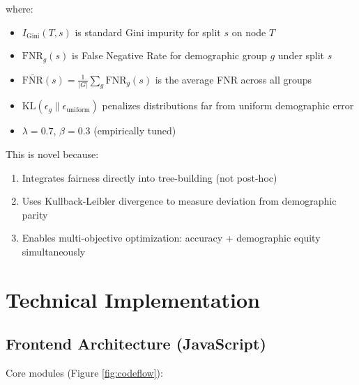 \documentclass[conference]{IEEEtran}
\begin{document}
where:
\begin{itemize}
    \item $I_{\text{Gini}}(T, s)$ is standard Gini impurity for split $s$ on node $T$
    \item $\text{FNR}_g(s)$ is False Negative Rate for demographic group $g$ under split $s$
    \item $\bar{\text{FNR}}(s) = \frac{1}{|G|} \sum_g \text{FNR}_g(s)$ is the average FNR across all groups
    \item $\text{KL}(\epsilon_g \| \epsilon_{\text{uniform}})$ penalizes distributions far from uniform demographic error
    \item $\lambda = 0.7$, $\beta = 0.3$ (empirically tuned)
\end{itemize}

This is novel because:
\begin{enumerate}
    \item Integrates fairness directly into tree-building (not post-hoc)
    \item Uses Kullback-Leibler divergence to measure deviation from demographic parity
    \item Enables multi-objective optimization: accuracy + demographic equity simultaneously
\end{enumerate}

\section{Technical Implementation}

\subsection{Frontend Architecture (JavaScript)}

Core modules (Figure \ref{fig:codeflow}):
\end{document}
